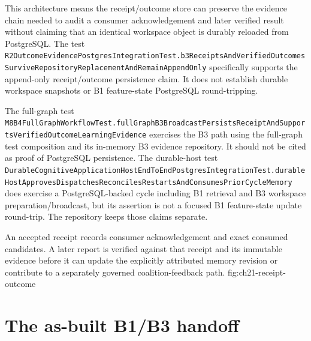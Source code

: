 This architecture means the receipt/outcome store can preserve the evidence chain needed to audit a consumer acknowledgement and later verified result without claiming that an identical workspace object is durably reloaded from PostgreSQL. The test \texttt{R2\allowbreak{}Outcome\allowbreak{}Evidence\allowbreak{}Postgres\allowbreak{}Integration\allowbreak{}Test.\allowbreak{}b3\allowbreak{}Receipts\allowbreak{}And\allowbreak{}Verified\allowbreak{}Outcomes\allowbreak{}Survive\allowbreak{}Repository\allowbreak{}Replacement\allowbreak{}And\allowbreak{}Remain\allowbreak{}Append\allowbreak{}Only} specifically supports the append-only receipt/outcome persistence claim. It does not establish durable workspace snapshots or B1 feature-state PostgreSQL round-tripping.

The full-graph test \texttt{M8\allowbreak{}B4\allowbreak{}Full\allowbreak{}Graph\allowbreak{}Workflow\allowbreak{}Test.\allowbreak{}full\allowbreak{}Graph\allowbreak{}B3\allowbreak{}Broadcast\allowbreak{}Persists\allowbreak{}Receipt\allowbreak{}And\allowbreak{}Supports\allowbreak{}Verified\allowbreak{}Outcome\allowbreak{}Learning\allowbreak{}Evidence} exercises the B3 path using the full-graph test composition and its in-memory B3 evidence repository. It should not be cited as proof of PostgreSQL persistence. The durable-host test \texttt{Durable\allowbreak{}Cognitive\allowbreak{}Application\allowbreak{}Host\allowbreak{}End\allowbreak{}To\allowbreak{}End\allowbreak{}Postgres\allowbreak{}Integration\allowbreak{}Test.\allowbreak{}durable\allowbreak{}Host\allowbreak{}Approves\allowbreak{}Dispatches\allowbreak{}Reconciles\allowbreak{}Restarts\allowbreak{}And\allowbreak{}Consumes\allowbreak{}Prior\allowbreak{}Cycle\allowbreak{}Memory} does exercise a PostgreSQL-backed cycle including B1 retrieval and B3 workspace preparation/broadcast, but its assertion is not a focused B1 feature-state update round-trip. The repository keeps those claims separate.

  {An accepted receipt records consumer acknowledgement and exact consumed candidates. A later report is verified against that receipt and its immutable evidence before it can update the explicitly attributed memory revision or contribute to a separately governed coalition-feedback path.}
  {fig:ch21-receipt-outcome}

\section{The as-built B1/B3 handoff}
\label{sec:ch21-b1-b3-handoff}

